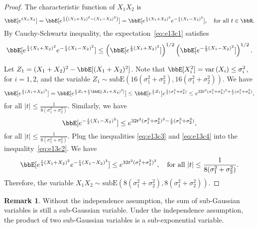 \documentclass[11pt]{article}
\DeclareMathOperator{\var}{var}
\newcommand{\of}[1]{\left(#1\right)}
\theoremstyle{plain}
\theoremstyle{definition}
\newtheorem{rmk}{Remark}
\begin{document}
\begin{proof}
The characteristic function of $X_1 X_2$ is 
\begin{equation}\label{eq:e13c1}
	\bbE[e^{t X_1 X_2}] = \bbE[e^{\frac{t}{4} \of{(X_1 + X_2)^2 - (X_1 - X_2)^2} }] = \bbE[ e^{\frac{t}{4} (X_1 +X_2 )^2} e^{-\frac{t}{4} (X_1 - X_2)^2 } ], \quad \text{for all } t \in \bbR.
\end{equation} 
By Cauchy-Schwartz inequality, the expectation~\eqref{eq:e13c1} satisfies
\begin{equation}\label{eq:e13c2}
	\bbE[ e^{\frac{t}{4} (X_1 +X_2 )^2} e^{-\frac{t}{4} (X_1 - X_2)^2 } ] \leq \of{\bbE[ e^{\frac{t}{2} (X_1 +X_2 )^2} ]}^{1/2} \of{\bbE[ e^{-\frac{t}{2} (X_1 -X_2 )^2} ]}^{1/2}.
\end{equation}

Let $Z_1 = (X_1 + X_2)^2 - \bbE[(X_1 + X_2)^2]$. Note that $\bbE[X^2_i] = \var{(X_i)} \leq \sigma^2_i $, for $ i = 1,2$, and the variable $Z_1 \sim \text{subE}(16(\sigma^2_1 + \sigma^2_2), 16(\sigma^2_1 + \sigma^2_2))$. We have
\begin{equation}\label{eq:e13c3}
	\bbE[ e^{\frac{t}{2} (X_1 +X_2 )^2} ] = \bbE[e^{\frac{t}{2} Z_1 + \frac{t}{2} \bbE[(X_1 + X_2)^2] }] \leq \bbE[e^{\frac{t}{2} Z_1}] e^{ \frac{t}{2} (\sigma_1^2 + \sigma_2^2) } \leq e^{32 t^2 (\sigma^2_1 + \sigma_2^2)^2 + \frac{t}{2} (\sigma^2_1 + \sigma_2^2) },
\end{equation}
for all  $|t| \leq \frac{1}{8 (\sigma^2_1 + \sigma_2^2)}$. Similarly, we have
\begin{equation}\label{eq:e13c4}
	\bbE[ e^{-\frac{t}{2} (X_1 -X_2 )^2} ]  \leq  e^{32 t^2 (\sigma^2_1 + \sigma_2^2)^2 - \frac{t}{2} (\sigma^2_1 + \sigma_2^2) },
\end{equation}
for all  $|t| \leq \frac{1}{8 (\sigma^2_1 + \sigma_2^2)}$. Plug the inequalities \eqref{eq:e13c3} and \eqref{eq:e13c4} into the inequality~\eqref{eq:e13c2}. We have
\begin{equation}
		\bbE[ e^{\frac{t}{4} (X_1 +X_2 )^2} e^{-\frac{t}{4} (X_1 - X_2)^2 } ]  \leq  e^{32 t^2 (\sigma^2_1 + \sigma_2^2)^2}, \quad \text{for all } |t| \leq \frac{1}{8 (\sigma^2_1 + \sigma_2^2)}.
\end{equation}
Therefore, the variable $X_1 X_2 \sim \text{subE}(8(\sigma^2_1 + \sigma^2_2),8(\sigma^2_1 + \sigma^2_2) )$.


\end{proof}

\begin{rmk}
	Without the independence assumption, the sum of sub-Gaussian variables is still a sub-Gaussian variable. Under the independence assumption, the product of two sub-Gaussian variables is a sub-exponential variable.
\end{rmk}
\end{document}
